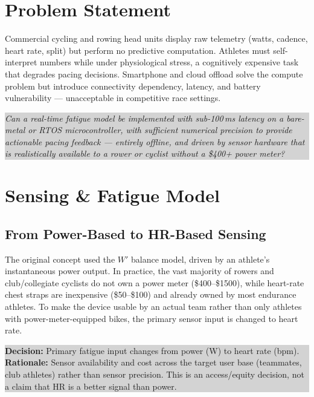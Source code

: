 \documentclass[11pt, letterpaper]{article}
\newcommand{\decision}[2]{%
  \par\vspace{0.4em}
  \noindent\colorbox{lightgray}{\parbox{0.97\linewidth}{\vspace{0.3em}
  \textbf{\color{trinityblue} Decision:} #1 \\[0.3em]
  \textbf{Rationale:} #2
  \vspace{0.3em}}}%
  \par\vspace{0.4em}
}
\begin{document}
\section{Problem Statement}

Commercial cycling and rowing head units display raw telemetry (watts, cadence, heart rate,
split) but perform no predictive computation. Athletes must self-interpret numbers while under
physiological stress, a cognitively expensive task that degrades pacing decisions. Smartphone
and cloud offload solve the compute problem but introduce connectivity dependency, latency, and
battery vulnerability --- unacceptable in competitive race settings.

\begin{center}
  \colorbox{lightgray}{\parbox{0.88\linewidth}{
      \vspace{0.4em}
      \textit{Can a real-time fatigue model be implemented with sub-100\,ms latency on a
        bare-metal or RTOS microcontroller, with sufficient numerical precision to provide
      actionable pacing feedback --- entirely offline, and driven by sensor hardware that is
      realistically available to a rower or cyclist without a \$400+ power meter?}
      \vspace{0.4em}
  }}
\end{center}

\section{Sensing \& Fatigue Model}

\subsection{From Power-Based to HR-Based Sensing}

The original concept used the $W'$ balance model, driven by an athlete's instantaneous power
output. In practice, the vast majority of rowers and club/collegiate cyclists do not own a
power meter (\$400--\$1500), while heart-rate chest straps are inexpensive (\$50--\$100) and
already owned by most endurance athletes. To make the device usable by an actual team rather
than only athletes with power-meter-equipped bikes, the primary sensor input is changed to
heart rate.

\decision{Primary fatigue input changes from power (W) to heart rate (bpm).}
{Sensor availability and cost across the target user base (teammates, club athletes) rather
than sensor precision. This is an access/equity decision, not a claim that HR is a better
signal than power.}
\end{document}
